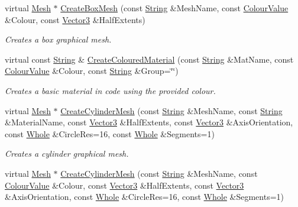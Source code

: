 \begin{DoxyCompactItemize}
virtual \hyperlink{classMezzanine_1_1Mesh}{Mesh} $\ast$ \hyperlink{classMezzanine_1_1MeshManager_a60d997162457cb7281c0fdfa37f95ee4}{CreateBoxMesh} (const \hyperlink{namespaceMezzanine_acf9fcc130e6ebf08e3d8491aebcf1c86}{String} \&MeshName, const \hyperlink{classMezzanine_1_1ColourValue}{ColourValue} \&Colour, const \hyperlink{classMezzanine_1_1Vector3}{Vector3} \&HalfExtents)
\begin{DoxyCompactList}\small\item\em Creates a box graphical mesh. \item\end{DoxyCompactList}\item 
virtual const \hyperlink{namespaceMezzanine_acf9fcc130e6ebf08e3d8491aebcf1c86}{String} \& \hyperlink{classMezzanine_1_1MeshManager_aabf94057016ff9ad8de101f5189713fd}{CreateColouredMaterial} (const \hyperlink{namespaceMezzanine_acf9fcc130e6ebf08e3d8491aebcf1c86}{String} \&MatName, const \hyperlink{classMezzanine_1_1ColourValue}{ColourValue} \&Colour, const \hyperlink{namespaceMezzanine_acf9fcc130e6ebf08e3d8491aebcf1c86}{String} \&Group=\char`\"{}\char`\"{})
\begin{DoxyCompactList}\small\item\em Creates a basic material in code using the provided colour. \item\end{DoxyCompactList}\item 
virtual \hyperlink{classMezzanine_1_1Mesh}{Mesh} $\ast$ \hyperlink{classMezzanine_1_1MeshManager_a6de2e01b43302a9439dc01c1dcc90f4c}{CreateCylinderMesh} (const \hyperlink{namespaceMezzanine_acf9fcc130e6ebf08e3d8491aebcf1c86}{String} \&MeshName, const \hyperlink{namespaceMezzanine_acf9fcc130e6ebf08e3d8491aebcf1c86}{String} \&MaterialName, const \hyperlink{classMezzanine_1_1Vector3}{Vector3} \&HalfExtents, const \hyperlink{classMezzanine_1_1Vector3}{Vector3} \&AxisOrientation, const \hyperlink{namespaceMezzanine_adcbb6ce6d1eb4379d109e51171e2e493}{Whole} \&CircleRes=16, const \hyperlink{namespaceMezzanine_adcbb6ce6d1eb4379d109e51171e2e493}{Whole} \&Segments=1)
\begin{DoxyCompactList}\small\item\em Creates a cylinder graphical mesh. \item\end{DoxyCompactList}\item 
virtual \hyperlink{classMezzanine_1_1Mesh}{Mesh} $\ast$ \hyperlink{classMezzanine_1_1MeshManager_aa2d52ca9f366145ce91ee68eb2d8c9a3}{CreateCylinderMesh} (const \hyperlink{namespaceMezzanine_acf9fcc130e6ebf08e3d8491aebcf1c86}{String} \&MeshName, const \hyperlink{classMezzanine_1_1ColourValue}{ColourValue} \&Colour, const \hyperlink{classMezzanine_1_1Vector3}{Vector3} \&HalfExtents, const \hyperlink{classMezzanine_1_1Vector3}{Vector3} \&AxisOrientation, const \hyperlink{namespaceMezzanine_adcbb6ce6d1eb4379d109e51171e2e493}{Whole} \&CircleRes=16, const \hyperlink{namespaceMezzanine_adcbb6ce6d1eb4379d109e51171e2e493}{Whole} \&Segments=1)

\end{DoxyCompactItemize}
